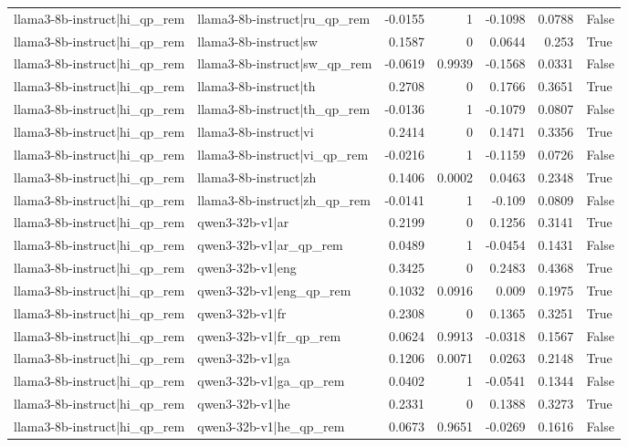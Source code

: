 \begin{table}
\begin{tabular}{l l r r r r l}
llama3-8b-instruct|hi_qp_rem & llama3-8b-instruct|ru_qp_rem & -0.0155 & 1 & -0.1098 & 0.0788 & False \\
llama3-8b-instruct|hi_qp_rem & llama3-8b-instruct|sw & 0.1587 & 0 & 0.0644 & 0.253 & True \\
llama3-8b-instruct|hi_qp_rem & llama3-8b-instruct|sw_qp_rem & -0.0619 & 0.9939 & -0.1568 & 0.0331 & False \\
llama3-8b-instruct|hi_qp_rem & llama3-8b-instruct|th & 0.2708 & 0 & 0.1766 & 0.3651 & True \\
llama3-8b-instruct|hi_qp_rem & llama3-8b-instruct|th_qp_rem & -0.0136 & 1 & -0.1079 & 0.0807 & False \\
llama3-8b-instruct|hi_qp_rem & llama3-8b-instruct|vi & 0.2414 & 0 & 0.1471 & 0.3356 & True \\
llama3-8b-instruct|hi_qp_rem & llama3-8b-instruct|vi_qp_rem & -0.0216 & 1 & -0.1159 & 0.0726 & False \\
llama3-8b-instruct|hi_qp_rem & llama3-8b-instruct|zh & 0.1406 & 0.0002 & 0.0463 & 0.2348 & True \\
llama3-8b-instruct|hi_qp_rem & llama3-8b-instruct|zh_qp_rem & -0.0141 & 1 & -0.109 & 0.0809 & False \\
llama3-8b-instruct|hi_qp_rem & qwen3-32b-v1|ar & 0.2199 & 0 & 0.1256 & 0.3141 & True \\
llama3-8b-instruct|hi_qp_rem & qwen3-32b-v1|ar_qp_rem & 0.0489 & 1 & -0.0454 & 0.1431 & False \\
llama3-8b-instruct|hi_qp_rem & qwen3-32b-v1|eng & 0.3425 & 0 & 0.2483 & 0.4368 & True \\
llama3-8b-instruct|hi_qp_rem & qwen3-32b-v1|eng_qp_rem & 0.1032 & 0.0916 & 0.009 & 0.1975 & True \\
llama3-8b-instruct|hi_qp_rem & qwen3-32b-v1|fr & 0.2308 & 0 & 0.1365 & 0.3251 & True \\
llama3-8b-instruct|hi_qp_rem & qwen3-32b-v1|fr_qp_rem & 0.0624 & 0.9913 & -0.0318 & 0.1567 & False \\
llama3-8b-instruct|hi_qp_rem & qwen3-32b-v1|ga & 0.1206 & 0.0071 & 0.0263 & 0.2148 & True \\
llama3-8b-instruct|hi_qp_rem & qwen3-32b-v1|ga_qp_rem & 0.0402 & 1 & -0.0541 & 0.1344 & False \\
llama3-8b-instruct|hi_qp_rem & qwen3-32b-v1|he & 0.2331 & 0 & 0.1388 & 0.3273 & True \\
llama3-8b-instruct|hi_qp_rem & qwen3-32b-v1|he_qp_rem & 0.0673 & 0.9651 & -0.0269 & 0.1616 & False \\

\end{tabular}
\end{table}
